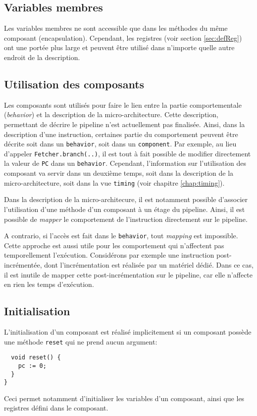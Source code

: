 \subsection{Variables membres}
Les variables membres ne sont accessible que dans les méthodes du même composant (encapsulation). Cependant, les registres (voir section \ref{sec:defReg}) ont une portée plus large et peuvent être utilisé dans n'importe quelle autre endroit de la description.

\subsection{Utilisation des composants}
Les composants sont utilisés pour faire le lien entre la partie comportementale (\emph{behavior}) et la description de la micro-architecture. Cette description, permettant de décrire le pipeline n'est actuellement pas finalisée.
Ainsi, dans la description d'une instruction, certaines partie du comportement peuvent être décrite soit dans un \texttt{behavior}, soit dans un \texttt{component}. Par exemple, au lieu d'appeler \texttt{Fetcher.branch(..)}, il est tout à fait possible de modifier directement la valeur de \texttt{PC} dans un \texttt{behavior}. Cependant, l'information sur l'utilisation des composant va servir dans un deuxième temps, soit dans la description de la micro-architecture, soit dans la vue \texttt{timing} (voir chapitre \ref{chap:timing}).

Dans la description de la micro-architecure, il est notamment possible d'associer l'utilisation d'une méthode d'un composant à un étage du pipeline. Ainsi, il est possible de \emph{mapper} le comportement de l'instruction directement sur le pipeline.

A contrario, si l'accès est fait dans le \texttt{behavior}, tout \emph{mapping} est impossible. Cette approche est aussi utile pour les comportement qui n'affectent pas temporellement l'exécution. Considérons par exemple une instruction post-incrémentée, dont l'incrémentation est réalisée par un matériel dédié. Dans ce cas, il est inutile de mapper cette post-incrémentation sur le pipeline, car elle n'affecte en rien les temps d'exécution.

\subsection{Initialisation}
\label{sec:initComponent}
L'initialisation d'un composant est réalisé implicitement si un composant possède une méthode \texttt{reset} qui ne prend aucun argument:
\begin{lstlisting}
  void reset() {
    pc := 0;
  }
}
\end{lstlisting}
Ceci permet notamment d'initialiser les variables d'un composant, ainsi que les registres défini dans le composant.


